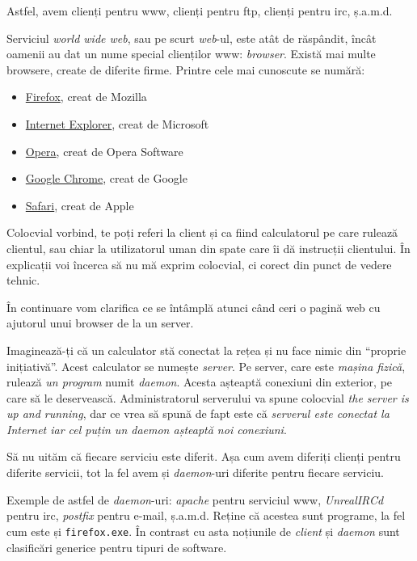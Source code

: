 Astfel, avem clienți pentru www, clienți pentru ftp, clienți pentru irc, ș.a.m.d.

Serviciul \textit{world wide web}, sau pe scurt \textit{web}-ul, este atât de răspândit, încât
oamenii au dat un nume special clienților www: \textsl{browser}. Există mai multe browsere,
create de diferite firme. Printre cele mai cunoscute se numără:
\begin{itemize}
\item \href{http://en.wikipedia.org/wiki/Firefox}{Firefox}, creat de Mozilla
\item \href{http://en.wikipedia.org/wiki/Internet_explorer}{Internet Explorer}, creat de Microsoft
\item \href{http://en.wikipedia.org/wiki/Opera_(web_browser)}{Opera}, creat de Opera Software
\item \href{http://en.wikipedia.org/wiki/Chrome_(web_browser)}{Google Chrome}, creat de Google
\item \href{http://en.wikipedia.org/wiki/Safari_(browser)}{Safari}, creat de Apple
\end{itemize}

Colocvial vorbind, te poți referi la client și
ca fiind calculatorul pe care rulează clientul, sau chiar la utilizatorul uman din spate
care îi dă instrucții clientului. În explicații voi încerca să nu mă exprim colocvial, ci
corect din punct de vedere tehnic.

În continuare vom clarifica ce se întâmplă atunci când ceri o pagină web cu ajutorul
unui browser de la un server.

Imaginează-ți că un calculator stă conectat la rețea și
nu face nimic din ``proprie inițiativă''.
Acest calculator se numește \textsl{server}. Pe server, care este
\textit{mașina fizică}, rulează \textit{un program} numit \textsl{daemon}.
Acesta așteaptă conexiuni din
exterior, pe care să le deservească. Administratorul serverului va spune colocvial
\textit{the server is up and running}, dar ce vrea să spună de fapt este că \textit{serverul
este conectat la Internet iar cel puțin un daemon așteaptă noi conexiuni}.

Să nu uităm că fiecare serviciu este diferit. Așa cum avem diferiți clienți pentru
diferite servicii, tot la fel avem și \textit{daemon}-uri diferite pentru fiecare serviciu.

Exemple de astfel de \textit{daemon}-uri: \textsl{apache} pentru serviciul
www, \textsl{UnrealIRCd} pentru irc,
\textsl{postfix} pentru e-mail, ș.a.m.d. Reține că acestea sunt programe, la fel
cum este și \texttt{firefox.exe}. În contrast cu asta noțiunile de \textit{client} și
\textit{daemon} sunt clasificări
generice pentru tipuri de software.

